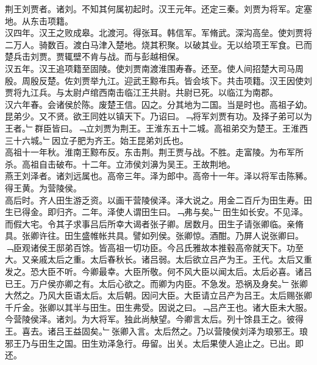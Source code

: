 \documentclass{zhvt-classic}
\begin{document}

\hspace*{2em}荆王刘贾者。诸刘。不知其何属初起时。汉王元年。还定三秦。刘贾为将军。定塞地。从东击项籍。\\
\hspace*{2em}汉四年。汉王之败成皋。北渡河。得张耳。韩信军。军脩武。深沟高垒。使刘贾将二万人。骑数百。渡白马津入楚地。烧其积聚。以破其业。无以给项王军食。已而楚兵击刘贾。贾辄壁不肯与战。而与彭越相保。\\
\hspace*{2em}汉五年。汉王追项籍至固陵。使刘贾南渡淮围寿春。还至。使人间招楚大司马周殷。周殷反楚。佐刘贾举九江。迎武王黥布兵。皆会垓下。共击项籍。汉王因使刘贾将九江兵。与太尉卢绾西南击临江王共尉。共尉已死。以临江为南郡。\\
\hspace*{2em}汉六年春。会诸侯於陈。废楚王信。囚之。分其地为二国。当是时也。高祖子幼。昆弟少。又不贤。欲王同姓以镇天下。乃诏曰。﹁将军刘贾有功。及择子弟可以为王者。﹂群臣皆曰。﹁立刘贾为荆王。王淮东五十二城。高祖弟交为楚王。王淮西三十六城。﹂因立子肥为齐王。始王昆弟刘氏也。\\
\hspace*{2em}高祖十一年秋。淮南王黥布反。东击荆。荆王贾与战。不胜。走富陵。为布军所杀。高祖自击破布。十二年。立沛侯刘濞为吴王。王故荆地。\\
\hspace*{2em}燕王刘泽者。诸刘远属也。高帝三年。泽为郎中。高帝十一年。泽以将军击陈豨。得王黄。为营陵侯。\\
\hspace*{2em}高后时。齐人田生游乏资。以画干营陵侯泽。泽大说之。用金二百斤为田生寿。田生已得金。即归齐。二年。泽使人谓田生曰。﹁弗与矣。﹂田生如长安。不见泽。而假大宅。令其子求事吕后所幸大谒者张子卿。居数月。田生子请张卿临。亲脩具。张卿许往。田生盛帷帐共具。譬如列侯。张卿惊。酒酣。乃屏人说张卿曰。﹁臣观诸侯王邸弟百馀。皆高祖一切功臣。今吕氏雅故本推毂高帝就天下。功至大。又亲戚太后之重。太后春秋长。诸吕弱。太后欲立吕产为王。王代。太后又重发之。恐大臣不听。今卿最幸。大臣所敬。何不风大臣以闻太后。太后必喜。诸吕已王。万户侯亦卿之有。太后心欲之。而卿为内臣。不急发。恐祸及身矣。﹂张卿大然之。乃风大臣语太后。太后朝。因问大臣。大臣请立吕产为吕王。太后赐张卿千斤金。张卿以其半与田生。田生弗受。因说之曰。﹁吕产王也。诸大臣未大服。今营陵侯泽。诸刘。为大将军。独此尚觖望。今卿言太后。列十馀县王之。彼得王。喜去。诸吕王益固矣。﹂张卿入言。太后然之。乃以营陵侯刘泽为琅邪王。琅邪王乃与田生之国。田生劝泽急行。毋留。出关。太后果使人追止之。已出。即还。\\
\end{document}

